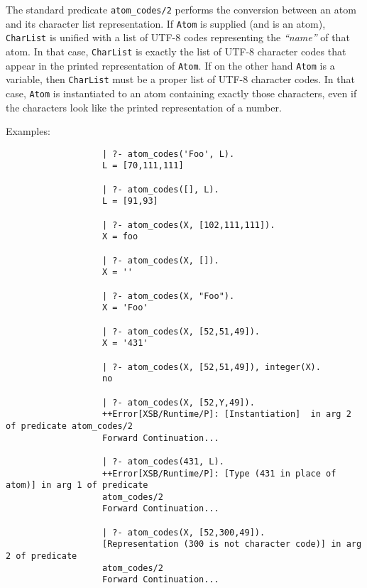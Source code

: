 \begin{description}

    The standard predicate {\tt atom\_codes/2} performs the conversion 
    between an atom and its character list representation. 
    If {\tt Atom} is supplied (and is an atom), {\tt CharList} 
    is unified with a list of UTF-8 codes representing the {\em ``name''} 
    of that atom.  In that case, {\tt CharList} is exactly the list of 
    UTF-8 character codes that appear in the printed representation of 
    {\tt Atom}.  If on the other hand {\tt Atom} is a variable, 
    then {\tt CharList} must be a proper list of UTF-8 character codes. 
    In that case, {\tt Atom} is instantiated to an atom containing
    exactly those characters, even if the characters look like the
    printed representation of a number.

    Examples:
    {\footnotesize
     \begin{verbatim}
                   | ?- atom_codes('Foo', L).
                   L = [70,111,111]

                   | ?- atom_codes([], L).
                   L = [91,93]

                   | ?- atom_codes(X, [102,111,111]).
                   X = foo
 
                   | ?- atom_codes(X, []).
                   X = ''

                   | ?- atom_codes(X, "Foo").
                   X = 'Foo'

                   | ?- atom_codes(X, [52,51,49]).
                   X = '431'

                   | ?- atom_codes(X, [52,51,49]), integer(X).
                   no

                   | ?- atom_codes(X, [52,Y,49]).
                   ++Error[XSB/Runtime/P]: [Instantiation]  in arg 2 of predicate atom_codes/2
                   Forward Continuation...

                   | ?- atom_codes(431, L).
                   ++Error[XSB/Runtime/P]: [Type (431 in place of atom)] in arg 1 of predicate 
                   atom_codes/2
                   Forward Continuation...

                   | ?- atom_codes(X, [52,300,49]).
                   [Representation (300 is not character code)] in arg 2 of predicate 
                   atom_codes/2
                   Forward Continuation...
     \end{verbatim}}


\end{description}

